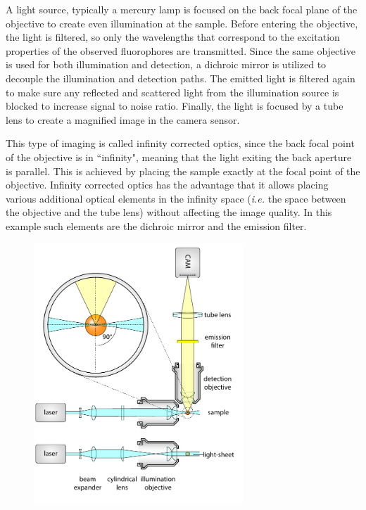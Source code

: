     A light source, typically a mercury lamp is focused on the back focal plane of the objective to create even illumination at the sample. Before entering the objective, the light is filtered, so only the wavelengths that correspond to the excitation properties of the observed fluorophores are transmitted. Since the same objective is used for both illumination and detection, a dichroic mirror is utilized to decouple the illumination and detection paths. The emitted light is filtered again to make sure any reflected and scattered light from the illumination source is blocked to increase signal to noise ratio.
    Finally, the light is focused by a tube lens to create a magnified image in the camera sensor.
    
    This type of imaging is called infinity corrected optics, since the back focal point of the objective is in ``infinity", meaning that the light exiting the back aperture is parallel. This is achieved by placing the sample exactly at the focal point of the objective. Infinity corrected optics has the advantage that it allows placing various additional optical elements in the infinity space (\textit{i.e.} the space between the objective and the tube lens) without affecting the image quality. In this example such elements are the dichroic mirror and the emission filter. 

    \begin{figure}[tb]
      \centering
      \includegraphics[page=4,width=0.7\textwidth]{spim_cyl}
      \label{fig:wide-field}
    \end{figure}


